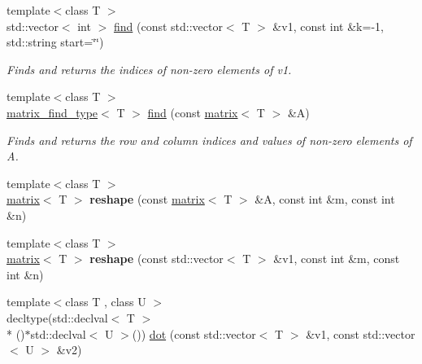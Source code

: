 \begin{DoxyCompactItemize}
\item 
\hypertarget{namespacekeycpp_ae34a4afffae90a5579e08be7d2177b2c}{{\footnotesize template$<$class T $>$ }\\std\-::vector$<$ int $>$ \hyperlink{namespacekeycpp_ae34a4afffae90a5579e08be7d2177b2c}{find} (const std\-::vector$<$ T $>$ \&v1, const int \&k=-\/1, std\-::string start=\char`\"{}\char`\"{})}\label{namespacekeycpp_ae34a4afffae90a5579e08be7d2177b2c}

\begin{DoxyCompactList}\small\item\em Finds and returns the indices of non-\/zero elements of v1. \end{DoxyCompactList}\item 
\hypertarget{namespacekeycpp_a97f0fc27cf8489f3f556fb1a0c975115}{{\footnotesize template$<$class T $>$ }\\\hyperlink{structkeycpp_1_1matrix__find__type}{matrix\-\_\-find\-\_\-type}$<$ T $>$ \hyperlink{namespacekeycpp_a97f0fc27cf8489f3f556fb1a0c975115}{find} (const \hyperlink{classkeycpp_1_1matrix}{matrix}$<$ T $>$ \&A)}\label{namespacekeycpp_a97f0fc27cf8489f3f556fb1a0c975115}

\begin{DoxyCompactList}\small\item\em Finds and returns the row and column indices and values of non-\/zero elements of A. \end{DoxyCompactList}\item 
\hypertarget{namespacekeycpp_a5ef6aab5ede3802c66f27415107594ed}{{\footnotesize template$<$class T $>$ }\\\hyperlink{classkeycpp_1_1matrix}{matrix}$<$ T $>$ {\bfseries reshape} (const \hyperlink{classkeycpp_1_1matrix}{matrix}$<$ T $>$ \&A, const int \&m, const int \&n)}\label{namespacekeycpp_a5ef6aab5ede3802c66f27415107594ed}

\item 
\hypertarget{namespacekeycpp_a5a32dc59a247e09814a4b8ce9ea1db57}{{\footnotesize template$<$class T $>$ }\\\hyperlink{classkeycpp_1_1matrix}{matrix}$<$ T $>$ {\bfseries reshape} (const std\-::vector$<$ T $>$ \&v1, const int \&m, const int \&n)}\label{namespacekeycpp_a5a32dc59a247e09814a4b8ce9ea1db57}

\item 
\hypertarget{namespacekeycpp_af2f586b97047513a6d2fa346d2302af0}{{\footnotesize template$<$class T , class U $>$ }\\decltype(std\-::declval$<$ T $>$\\*
()$\ast$std\-::declval$<$ U $>$()) \hyperlink{namespacekeycpp_af2f586b97047513a6d2fa346d2302af0}{dot} (const std\-::vector$<$ T $>$ \&v1, const std\-::vector$<$ U $>$ \&v2)}\label{namespacekeycpp_af2f586b97047513a6d2fa346d2302af0}


\end{DoxyCompactItemize}
